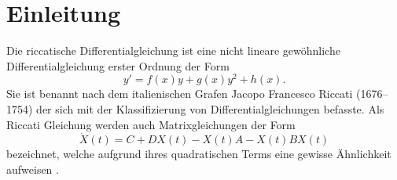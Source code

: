 \section{Einleitung} \label{kra:section:einleitung}
Die riccatische Differentialgleichung ist eine nicht lineare gewöhnliche Differentialgleichung erster Ordnung der Form
\begin{equation}
    \label{kra:equation:riccati}
    y' = f(x)y + g(x)y^2 + h(x).
\end{equation}
Sie ist benannt nach dem italienischen Grafen Jacopo Francesco Riccati (1676–1754) der sich mit der Klassifizierung von Differentialgleichungen befasste.
Als Riccati Gleichung werden auch Matrixgleichungen der Form
\begin{equation}
    \label{kra:equation:matrixriccati}
    \dot{X}(t) = C + DX(t) - X(t)A -X(t)BX(t)
\end{equation}
bezeichnet, welche aufgrund ihres quadratischen Terms eine gewisse Ähnlichkeit aufweisen \cite{kra:riccati} \cite{kra:ethz}.
